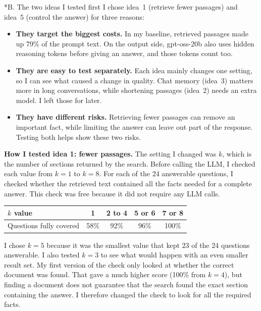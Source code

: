 \documentclass[10pt,a4paper]{article}
\makeatletter
\renewcommand\section{\@startsection{section}{1}{\z@}{0.9em}{0.35em}{\normalfont\large\bfseries}}
\makeatother
\begin{document}
\section*{B. The two ideas I tested first}
I chose idea~1 (retrieve fewer passages) and idea~5 (control the answer) for three reasons:
\begin{itemize}
\item \textbf{They target the biggest costs.} In my baseline, retrieved passages made up 79\% of the prompt text. On the output side, gpt-oss-20b also uses hidden reasoning tokens before giving an answer, and those tokens count too.
\item \textbf{They are easy to test separately.} Each idea mainly changes one setting, so I can see what caused a change in quality. Chat memory (idea~3) matters more in long conversations, while shortening passages (idea~2) needs an extra model. I left those for later.
\item \textbf{They have different risks.} Retrieving fewer passages can remove an important fact, while limiting the answer can leave out part of the response. Testing both helps show these two risks.
\end{itemize}

\textbf{How I tested idea 1: fewer passages.}
The setting I changed was $k$, which is the number of sections returned by the search. Before calling the LLM, I checked each value from $k{=}1$ to $k{=}8$. For each of the 24 answerable questions, I checked whether the retrieved text contained all the facts needed for a complete answer. This check was free because it did not require any LLM calls.

\begin{center}\footnotesize
\begin{tabular}{lcccc}
\toprule
$k$ value & 1 & 2 to 4 & 5 or 6 & 7 or 8\\
\midrule
Questions fully covered & 58\% & 92\% & 96\% & 100\%\\
\bottomrule
\end{tabular}
\end{center}

I chose $k{=}5$ because it was the smallest value that kept 23 of the 24 questions answerable. I also tested $k{=}3$ to see what would happen with an even smaller result set.
My first version of the check only looked at whether the correct document was found. That gave a much higher score (100\% from $k{=}4$), but finding a document does not guarantee that the search found the exact section containing the answer. I therefore changed the check to look for all the required facts.
\end{document}

